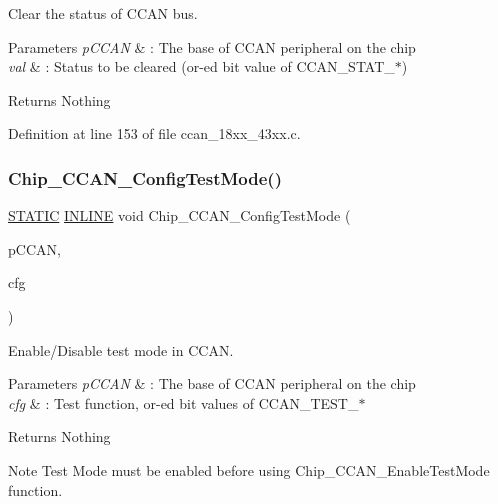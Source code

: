 Clear the status of C\+C\+AN bus. 


\begin{DoxyParams}{Parameters}
{\em p\+C\+C\+AN} & \+: The base of C\+C\+AN peripheral on the chip \\
\hline
{\em val} & \+: Status to be cleared (or-\/ed bit value of C\+C\+A\+N\+\_\+\+S\+T\+A\+T\+\_\+$\ast$) \\
\hline
\end{DoxyParams}
\begin{DoxyReturn}{Returns}
Nothing 
\end{DoxyReturn}


Definition at line 153 of file ccan\+\_\+18xx\+\_\+43xx.\+c.

\mbox{\label{group___c_c_a_n__18_x_x__43_x_x_ga6348cfc02990a10658e6b3b800c2d702}} 
\subsubsection{\texorpdfstring{Chip\+\_\+\+C\+C\+A\+N\+\_\+\+Config\+Test\+Mode()}{Chip\_CCAN\_ConfigTestMode()}}
{\footnotesize\ttfamily \hyperlink{group___l_p_c___types___public___macros_ga10b2d890d871e1489bb02b7e70d9bdfb}{S\+T\+A\+T\+IC} \hyperlink{spifi__18xx__43xx_8h_a2eb6f9e0395b47b8d5e3eeae4fe0c116}{I\+N\+L\+I\+NE} void Chip\+\_\+\+C\+C\+A\+N\+\_\+\+Config\+Test\+Mode (\begin{DoxyParamCaption}\item[{\hyperlink{struct_l_p_c___c_c_a_n___t}{L\+P\+C\+\_\+\+C\+C\+A\+N\+\_\+T} $\ast$}]{p\+C\+C\+AN,  }\item[{uint32\+\_\+t}]{cfg }\end{DoxyParamCaption})}



Enable/\+Disable test mode in C\+C\+AN. 


\begin{DoxyParams}{Parameters}
{\em p\+C\+C\+AN} & \+: The base of C\+C\+AN peripheral on the chip \\
\hline
{\em cfg} & \+: Test function, or-\/ed bit values of C\+C\+A\+N\+\_\+\+T\+E\+S\+T\+\_\+$\ast$ \\
\hline
\end{DoxyParams}
\begin{DoxyReturn}{Returns}
Nothing 
\end{DoxyReturn}
\begin{DoxyNote}{Note}
Test Mode must be enabled before using Chip\+\_\+\+C\+C\+A\+N\+\_\+\+Enable\+Test\+Mode function. 
\end{DoxyNote}


